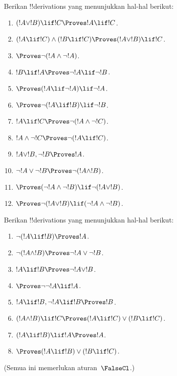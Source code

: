 \documentclass[../../../include/open-logic-section]{subfiles}
\begin{document}
\begin{prob}
Berikan !!{derivation}s yang menunjukkan hal-hal berikut:
\begin{enumerate}
\item $(!A \lor !B) \lif !C \Proves !A \lif !C$.
\item $(!A \lif !C) \land (!B \lif !C) \Proves (!A \lor !B) \lif !C$.
\item $\Proves \lnot(!A \land \lnot !A)$.
\item $!B \lif !A \Proves \lnot !A \lif \lnot !B$.
\item $\Proves (!A \lif \lnot !A) \lif \lnot !A$.
\item $\Proves \lnot(!A \lif !B) \lif \lnot !B$.
\item $!A \lif !C \Proves \lnot (!A \land \lnot !C)$.
\item $!A \land \lnot !C \Proves \lnot (!A \lif !C)$.
\item $!A \lor !B, \lnot !B \Proves !A$.
\item $\lnot !A \lor \lnot !B \Proves \lnot(!A \land !B)$.
\item $\Proves (\lnot !A \land \lnot !B) \lif\lnot(!A \lor !B)$.
\item $\Proves \lnot(!A \lor !B) \lif (\lnot !A \land \lnot !B)$.
\end{enumerate}
\end{prob}

\begin{prob}
Berikan !!{derivation}s yang menunjukkan hal-hal berikut:
\begin{enumerate}
\item $\lnot(!A \lif !B) \Proves !A$.
\item $\lnot(!A \land !B) \Proves \lnot !A \lor \lnot !B$.
\item $!A \lif !B \Proves \lnot !A \lor !B$.
\item $\Proves \lnot \lnot !A \lif !A$.
\item $!A \lif !B, \lnot !A \lif !B \Proves !B$.
\item $(!A \land !B) \lif !C \Proves (!A \lif !C) \lor (!B \lif !C)$.
\item $(!A \lif !B) \lif !A \Proves !A$.
\item $\Proves (!A \lif !B) \lor (!B \lif !C)$.
\end{enumerate}
(Semua ini memerlukan aturan~$\FalseCl$.)
\end{prob}
\end{document}
